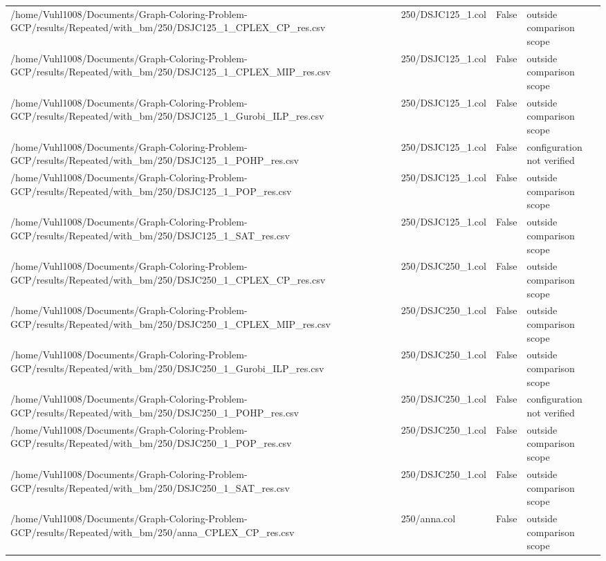\begin{table}[htbp]
\begin{tabular}{llll}
/home/Vuhl1008/Documents/Graph-Coloring-Problem-GCP/results/Repeated/with\_bm/250/DSJC125\_1\_CPLEX\_CP\_res.csv & 250/DSJC125\_1.col & False & outside comparison scope \\
/home/Vuhl1008/Documents/Graph-Coloring-Problem-GCP/results/Repeated/with\_bm/250/DSJC125\_1\_CPLEX\_MIP\_res.csv & 250/DSJC125\_1.col & False & outside comparison scope \\
/home/Vuhl1008/Documents/Graph-Coloring-Problem-GCP/results/Repeated/with\_bm/250/DSJC125\_1\_Gurobi\_ILP\_res.csv & 250/DSJC125\_1.col & False & outside comparison scope \\
/home/Vuhl1008/Documents/Graph-Coloring-Problem-GCP/results/Repeated/with\_bm/250/DSJC125\_1\_POHP\_res.csv & 250/DSJC125\_1.col & False & configuration not verified \\
/home/Vuhl1008/Documents/Graph-Coloring-Problem-GCP/results/Repeated/with\_bm/250/DSJC125\_1\_POP\_res.csv & 250/DSJC125\_1.col & False & outside comparison scope \\
/home/Vuhl1008/Documents/Graph-Coloring-Problem-GCP/results/Repeated/with\_bm/250/DSJC125\_1\_SAT\_res.csv & 250/DSJC125\_1.col & False & outside comparison scope \\
/home/Vuhl1008/Documents/Graph-Coloring-Problem-GCP/results/Repeated/with\_bm/250/DSJC250\_1\_CPLEX\_CP\_res.csv & 250/DSJC250\_1.col & False & outside comparison scope \\
/home/Vuhl1008/Documents/Graph-Coloring-Problem-GCP/results/Repeated/with\_bm/250/DSJC250\_1\_CPLEX\_MIP\_res.csv & 250/DSJC250\_1.col & False & outside comparison scope \\
/home/Vuhl1008/Documents/Graph-Coloring-Problem-GCP/results/Repeated/with\_bm/250/DSJC250\_1\_Gurobi\_ILP\_res.csv & 250/DSJC250\_1.col & False & outside comparison scope \\
/home/Vuhl1008/Documents/Graph-Coloring-Problem-GCP/results/Repeated/with\_bm/250/DSJC250\_1\_POHP\_res.csv & 250/DSJC250\_1.col & False & configuration not verified \\
/home/Vuhl1008/Documents/Graph-Coloring-Problem-GCP/results/Repeated/with\_bm/250/DSJC250\_1\_POP\_res.csv & 250/DSJC250\_1.col & False & outside comparison scope \\
/home/Vuhl1008/Documents/Graph-Coloring-Problem-GCP/results/Repeated/with\_bm/250/DSJC250\_1\_SAT\_res.csv & 250/DSJC250\_1.col & False & outside comparison scope \\
/home/Vuhl1008/Documents/Graph-Coloring-Problem-GCP/results/Repeated/with\_bm/250/anna\_CPLEX\_CP\_res.csv & 250/anna.col & False & outside comparison scope \\

\end{tabular}
\end{table}
